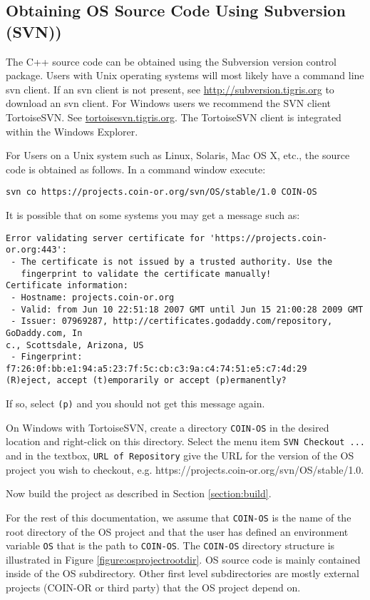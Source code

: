 \documentclass[11pt]{article}
\newcounter{Fig}
\renewcommand{\_}{{\char"5F}}
\renewcommand{\{}{{\char"7B}}
\renewcommand{\}}{{\char"7D}}
\renewcommand{\^}{{\char"0D}}
\renewcommand{\'}{{\char"0D}}
\begin{document}
\subsection{Obtaining OS Source Code Using Subversion (SVN))}\label{section:svn}

The C++ source code can be obtained using the Subversion version control package.  Users with Unix operating systems will most likely have a command line svn client.  If an svn client is not present, see \url{http://subversion.tigris.org} to download an svn client.   For Windows users we recommend the  SVN client  TortoiseSVN.  See \url{tortoisesvn.tigris.org}.  The TortoiseSVN client is integrated within the Windows  Explorer.

For Users on a Unix system such as Linux, Solaris, Mac OS X, etc., the source code is obtained as follows. In a command window execute:

\begin{verbatim}
svn co https://projects.coin-or.org/svn/OS/stable/1.0 COIN-OS
\end{verbatim}


It is possible that on some systems you may get a message such as:
\begin{verbatim}
Error validating server certificate for 'https://projects.coin-or.org:443':
 - The certificate is not issued by a trusted authority. Use the
   fingerprint to validate the certificate manually!
Certificate information:
 - Hostname: projects.coin-or.org
 - Valid: from Jun 10 22:51:18 2007 GMT until Jun 15 21:00:28 2009 GMT
 - Issuer: 07969287, http://certificates.godaddy.com/repository, GoDaddy.com, In
c., Scottsdale, Arizona, US
 - Fingerprint: f7:26:0f:bb:e1:94:a5:23:7f:5c:cb:c3:9a:c4:74:51:e5:c7:4d:29
(R)eject, accept (t)emporarily or accept (p)ermanently?
\end{verbatim}

If so, select {\tt (p)} and you should not get this message again.

On Windows with TortoiseSVN, create a directory {\tt COIN-OS} in the desired location and right-click on this directory.   Select the menu item {\tt SVN Checkout ...} and in the textbox, {\tt URL of Repository}
give the URL for the version of the OS project you wish to checkout, e.g. https://projects.coin-or.org/svn/OS/stable/1.0.


Now build the project as described in  Section \ref{section:build}.

For the rest of this documentation, we assume that  {\tt COIN-OS} is the name of the root directory of the OS project and that the user has defined an environment variable {\tt OS} that is the path to {\tt COIN-OS}.  The {\tt COIN-OS} directory structure is illustrated in Figure \ref{figure:osprojectrootdir}. OS source code is mainly contained inside of the OS subdirectory. Other first level subdirectories are mostly external projects (COIN-OR or third party) that the OS project depend on.
\end{document}
